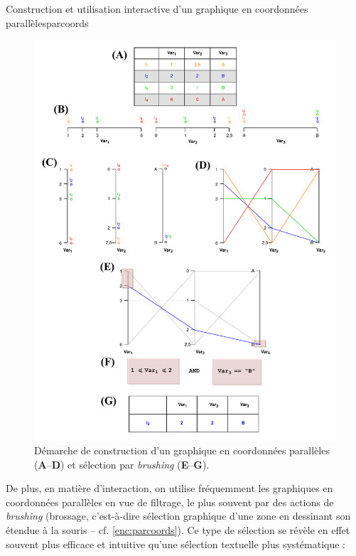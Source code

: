 	\begin{encadre}{Construction et utilisation interactive d'un graphique en coordonnées parallèles}{parcoords}

			\begin{figure}[H]
			\captionsetup{width=\linewidth}
			\includegraphics[width=\linewidth]{img/ParCoords_Brush.pdf}
			\caption{Démarche de construction d'un graphique en coordonnées parallèles (\textbf{A}--\textbf{D}) et sélection par \textit{brushing} (\textbf{E}--\textbf{G}).}
			\label{fig:schema_parcoords}
		\end{figure}

	\end{encadre}



	De plus, en matière d'interaction, on utilise fréquemment les graphiques en coordonnées parallèles en vue de filtrage, le plus souvent par des actions de \textit{brushing} (\og brossage\fg{}, c'est-à-dire sélection graphique d'une zone en dessinant son étendue à la souris -- cf. \cref{enc:parcoords}).
	Ce type de sélection se révèle en effet souvent plus efficace et intuitive qu'une sélection textuelle plus systématique :

